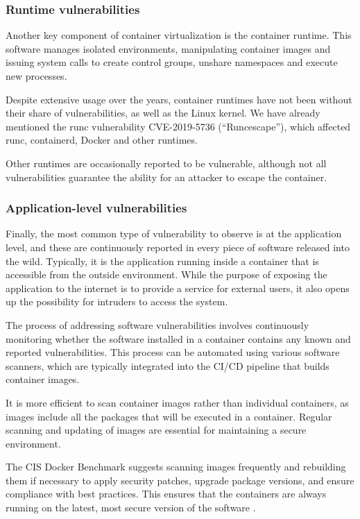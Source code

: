 \subsubsection{Runtime vulnerabilities}

Another key component of container virtualization is the container runtime. This software manages isolated environments, manipulating container images and issuing system calls to create control groups, unshare namespaces and execute new processes.

Despite extensive usage over the years, container runtimes have not been without their share of vulnerabilities, as well as the Linux kernel. We have already mentioned the runc vulnerability CVE-2019-5736 (``Runcescape''), which affected runc, containerd, Docker and other runtimes. 

Other runtimes are occasionally reported to be vulnerable, although not all vulnerabilities guarantee the ability for an attacker to escape the container.

\subsubsection{Application-level vulnerabilities}

Finally, the most common type of vulnerability to observe is at the application level, and these are continuously reported in every piece of software released into the wild. Typically, it is the application running inside a container that is accessible from the outside environment. While the purpose of exposing the application to the internet is to provide a service for external users, it also opens up the possibility for intruders to access the system.

The process of addressing software vulnerabilities involves continuously monitoring whether the software installed in a container contains any known and reported vulnerabilities. This process can be automated using various software scanners, which are typically integrated into the CI/CD pipeline that builds container images.

It is more efficient to scan container images rather than individual containers, as images include all the packages that will be executed in a container. Regular scanning and updating of images are essential for maintaining a secure environment.

The CIS Docker Benchmark suggests scanning images frequently and rebuilding them if necessary to apply security patches, upgrade package versions, and ensure compliance with best practices. This ensures that the containers are always running on the latest, most secure version of the software \cite{cis:docker}.

